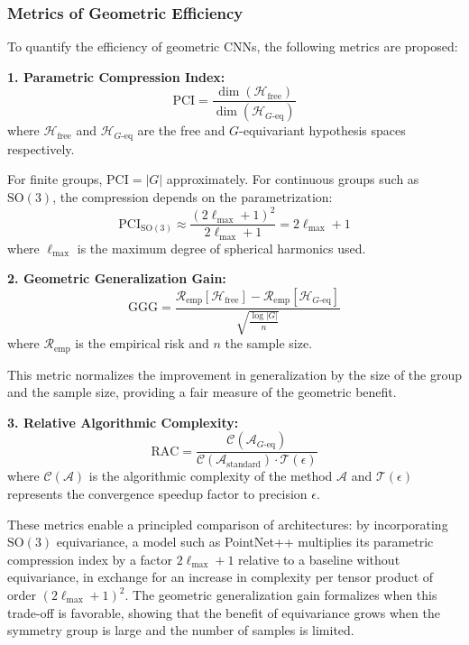 \subsubsection{Metrics of Geometric Efficiency}\label{subsubsec:metricas_eficiencia_geometrica}

To quantify the efficiency of geometric CNNs, the following metrics are proposed:

\textbf{1. Parametric Compression Index:}
\begin{equation}
\text{PCI} = \frac{\dim(\mathcal{H}_{\text{free}})}{\dim(\mathcal{H}_{G\text{-eq}})}
\end{equation}
where $\mathcal{H}_{\text{free}}$ and $\mathcal{H}_{G\text{-eq}}$ are the free and $G$-equivariant hypothesis spaces respectively.

For finite groups, $\text{PCI} = |G|$ approximately. For continuous groups such as $\text{SO}(3)$, the compression depends on the parametrization:
\begin{equation}
\text{PCI}_{\text{SO}(3)} \approx \frac{(2\ell_{\max} + 1)^2}{2\ell_{\max} + 1} = 2\ell_{\max} + 1
\end{equation}
where $\ell_{\max}$ is the maximum degree of spherical harmonics used.

\textbf{2. Geometric Generalization Gain:}
\begin{equation}
\text{GGG} = \frac{\mathcal{R}_{\text{emp}}[\mathcal{H}_{\text{free}}] - \mathcal{R}_{\text{emp}}[\mathcal{H}_{G\text{-eq}}]}{\sqrt{\frac{\log |G|}{n}}}
\end{equation}
where $\mathcal{R}_{\text{emp}}$ is the empirical risk and $n$ the sample size.

This metric normalizes the improvement in generalization by the size of the group and the sample size, providing a fair measure of the geometric benefit.

\textbf{3. Relative Algorithmic Complexity:}
\begin{equation}
\text{RAC} = \frac{\mathcal{C}(\mathcal{A}_{G\text{-eq}})}{\mathcal{C}(\mathcal{A}_{\text{standard}}) \cdot \mathcal{T}(\epsilon)}
\end{equation}
where $\mathcal{C}(\mathcal{A})$ is the algorithmic complexity of the method $\mathcal{A}$ and $\mathcal{T}(\epsilon)$ represents the convergence speedup factor to precision $\epsilon$.

These metrics enable a principled comparison of architectures: by incorporating $\text{SO}(3)$ equivariance, a model such as PointNet++ multiplies its parametric compression index by a factor $2\ell_{\max}+1$ relative to a baseline without equivariance, in exchange for an increase in complexity per tensor product of order $(2\ell_{\max}+1)^2$. The geometric generalization gain formalizes when this trade-off is favorable, showing that the benefit of equivariance grows when the symmetry group is large and the number of samples is limited.

